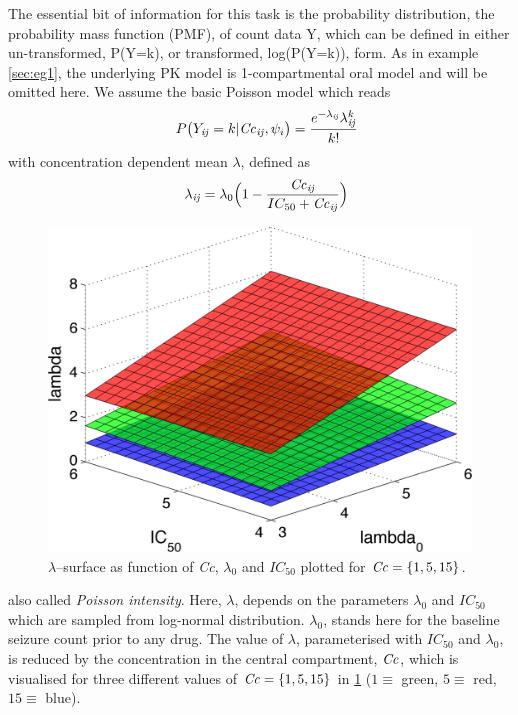 The essential bit of information for this task is the probability distribution, the probability 
mass function (PMF), of count data Y, which can be defined in either un-transformed, 
P(Y=k), or transformed, log(P(Y=k)), form. As in example \ref{sec:eg1}, the underlying 
PK model is 1-compartmental oral model and will be omitted here. We assume the basic 
Poisson model which reads
\begin{eqnarray}
&& P\big(Y_{\mathit{ij}}=k | \mathit{Cc}_{\mathit{ij}}, \psi_i\big) =  \frac{e^{-\lambda_{\mathit{ij}}} \lambda^k_{\mathit{ij}}}{k!} \label{eq:poissonModel}
\end{eqnarray}
with concentration dependent mean $\lambda$, defined as
\begin{eqnarray}
&& \lambda_{\mathit{ij}} = \lambda_0 \Big(1 - \frac{\mathit{Cc}_{\mathit{ij}}}{IC_{50} + \mathit{Cc}_{\mathit{ij}}}\Big)  \label{eq:lambdasurface}
\end{eqnarray}
\begin{figure}[htbp]
\centering
\includegraphics[width=.43\textwidth]{pics/CTS4_lambda_threeSurfaces} 
\caption{$\lambda$--surface as function of \emph{Cc}, $\lambda_0$ and $IC_{50}$ 
plotted for $\mathit{Cc} = \{1,5,15\}$.}
\label{fig:lambdasurface}
\end{figure}
also called \emph{Poisson intensity}. Here, $\lambda$, depends on the parameters 
$\lambda_0$ and $IC_{50}$ which are sampled from log-normal distribution. 
$\lambda_0$, stands here for the baseline seizure count prior to any drug. 
The value of $\lambda$, parameterised with $IC_{50}$ and $\lambda_0$, is reduced 
by the concentration in the central compartment, $\mathit{Cc}$, which is visualised for three different values 
of $\mathit{Cc} = \{1,5,15\}$ in \ref{fig:lambdasurface} ($1\equiv$ green, $5 \equiv$ 
red, $15 \equiv$ blue).


